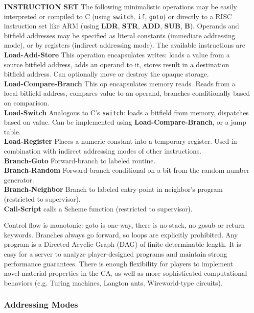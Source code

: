 \documentclass{acm_proc_article-sp}
\begin{document}
{\bf INSTRUCTION SET} The following minimalistic operations may be easily interpreted
or compiled to C (using {\tt switch}, {\tt if}, {\tt goto})
or directly to a RISC instruction set like ARM\cite{seal00}
(using {\bf LDR}, {\bf STR}, {\bf ADD}, {\bf SUB}, {\bf B}).
Operands and bitfield addresses may be specified as literal constants (immediate addressing mode), or by registers (indirect addressing mode).
The available instructions are
\\
{\bf Load-Add-Store} This operation encapsulates writes: loads a value from a source bitfield address, adds an operand to it, stores result in a destination bitfield address. Can optionally move or destroy the opaque storage.
\\
{\bf Load-Compare-Branch} This op encapsulates memory reads. Reads from a local bitfield address, compares value to an operand, branches conditionally based on comparison.
\\
{\bf Load-Switch} Analogous to C's {\tt switch}: loads a bitfield from memory, dispatches based on value. Can be implemented using {\bf Load-Compare-Branch}, or a jump table.
\\
{\bf Load-Register} Places a numeric constant into a temporary register. Used in combination with indirect addressing modes of other instructions.
\\
{\bf Branch-Goto} Forward-branch to labeled routine.
\\
{\bf Branch-Random} Forward-branch conditional on a bit from the random number generator.
\\
{\bf Branch-Neighbor} Branch to labeled entry point in neighbor's program (restricted to supervisor).
\\
{\bf Call-Script} calls a Scheme function (restricted to supervisor).

Control flow is monotonic: goto is one-way, there is no stack, no gosub or return keywords.
Branches always go forward, so loops are explicitly prohibited.
Any program is a Directed Acyclic Graph (DAG) of finite determinable length.
It is easy for a server to analyze player-designed programs and maintain strong performance guarantees.
There is enough flexibility for players to implement novel material properties in the CA,
as well as more sophisticated computational behaviors (e.g. Turing machines, Langton ants, Wireworld-type circuits).

\subsubsection{Addressing Modes}
\end{document}
